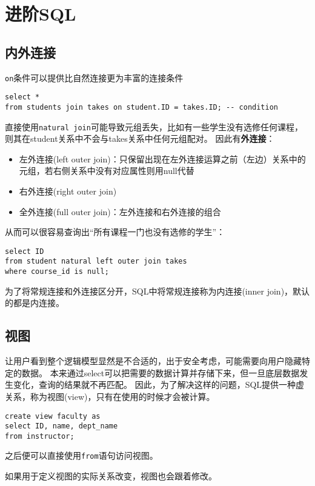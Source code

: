
\section{进阶SQL} %
\subsection{内外连接}
\verb'on'条件可以提供比自然连接更为丰富的连接条件
\begin{lstlisting}
select *
from students join takes on student.ID = takes.ID; -- condition
\end{lstlisting}

直接使用\verb'natural join'可能导致元组丢失，比如有一些学生没有选修任何课程，则其在student关系中不会与takes关系中任何元组配对。
因此有\textbf{外连接}：
\begin{itemize}
	\item 左外连接(left outer join)：只保留出现在左外连接运算之前（左边）关系中的元组，若右侧关系中没有对应属性则用null代替
	\item 右外连接(right outer join)
	\item 全外连接(full outer join)：左外连接和右外连接的组合
\end{itemize}

从而可以很容易查询出“所有课程一门也没有选修的学生”：
\begin{lstlisting}
select ID
from student natural left outer join takes
where course_id is null;
\end{lstlisting}

为了将常规连接和外连接区分开，SQL中将常规连接称为内连接(inner join)，默认的都是内连接。

\subsection{视图}
让用户看到整个逻辑模型显然是不合适的，出于安全考虑，可能需要向用户隐藏特定的数据。
本来通过select可以把需要的数据计算并存储下来，但一旦底层数据发生变化，查询的结果就不再匹配。
因此，为了解决这样的问题，SQL提供一种虚关系，称为视图(view)，只有在使用的时候才会被计算。
\begin{lstlisting}
create view faculty as
select ID, name, dept_name
from instructor;
\end{lstlisting}
之后便可以直接使用\verb'from'语句访问视图。

\begin{definition}
如果用于定义视图的实际关系改变，视图也会跟着修改。
\end{definition}

